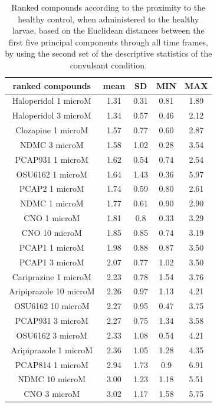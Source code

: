 \documentclass[a4paper,12pt]{article}
\begin{document}
\begin{table}[h!]\tiny
\centering
\caption{Ranked compounds according to the proximity to the healthy control, when administered to the healthy larvae, based on the Euclidean distances between the first five principal components through all time frames, by using the second set of the descriptive statistics of the convulsant condition.}
\begin{tabular}{|c|c|c|c|c|}
\hline
ranked compounds             & mean & SD   & MIN  & MAX   \\ \hline
Haloperidol 1 microM   & 1.31 & 0.31 & 0.81 & 1.89 \\ \hline
Haloperidol 3 microM   & 1.34 & 0.57 & 0.46 & 2.12 \\ \hline
Clozapine 1 microM     & 1.57 & 0.77 & 0.60  & 2.87 \\ \hline
NDMC 3 microM          & 1.58 & 1.02 & 0.28 & 3.54 \\ \hline
PCAP931 1 microM       & 1.62 & 0.54 & 0.74 & 2.54 \\ \hline
OSU6162 1 microM       & 1.64 & 1.43 & 0.36 & 5.97 \\ \hline
PCAP2 1 microM         & 1.74 & 0.59 & 0.80  & 2.61 \\ \hline
NDMC 1 microM          & 1.77 & 0.61 & 0.90  & 2.90  \\ \hline
CNO 1 microM           & 1.81 & 0.8  & 0.33 & 3.29 \\ \hline
CNO 10 microM          & 1.85 & 0.85 & 0.74 & 3.19 \\ \hline
PCAP1 1 microM         & 1.98 & 0.88 & 0.87 & 3.50  \\ \hline
PCAP1 3 microM         & 2.07 & 0.77 & 1.02 & 3.50  \\ \hline
Cariprazine 1 microM   & 2.23 & 0.78 & 1.54 & 3.76 \\ \hline
Aripiprazole 10 microM & 2.26 & 0.97 & 1.13 & 4.21 \\ \hline
OSU6162 10 microM      & 2.27 & 0.95 & 0.47 & 3.75 \\ \hline
PCAP931 3 microM       & 2.27 & 0.75 & 1.34 & 3.58 \\ \hline
OSU6162 3 microM       & 2.33 & 1.08 & 0.54 & 4.21 \\ \hline
Aripiprazole 1 microM  & 2.36 & 1.05 & 1.28 & 4.35 \\ \hline
PCAP814 1 microM       & 2.94 & 1.73 & 0.9  & 6.91 \\ \hline
NDMC 10 microM         & 3.00    & 1.23 & 1.18 & 5.51 \\ \hline
CNO 3 microM           & 3.02 & 1.17 & 1.58 & 5.75 \\ \hline

\end{tabular}
\end{table}
\end{document}
